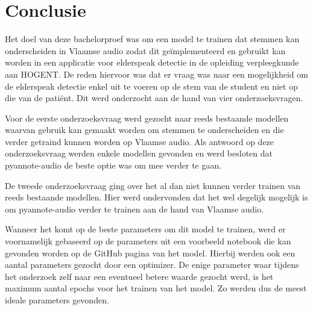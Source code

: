 
\chapter{Conclusie}%
\label{ch:conclusie}


Het doel van deze bachelorproef was om een model te trainen dat stemmen kan onderscheiden in Vlaamse audio zodat dit geïmplementeerd en gebruikt kan worden in een applicatie voor elderspeak detectie in de opleiding verpleegkunde aan HOGENT. De reden hiervoor was dat er vraag was naar een mogelijkheid om de elderspeak detectie enkel uit te voeren op de stem van de student en niet op die van de patiënt. Dit werd onderzocht aan de hand van vier onderzoeksvragen.

Voor de eerste onderzoeksvraag werd gezocht naar reeds bestaande modellen waarvan gebruik kan gemaakt worden om stemmen te onderscheiden en die verder getraind kunnen worden op Vlaamse audio. Als antwoord op deze onderzoeksvraag werden enkele modellen gevonden en werd besloten dat pyannote-audio de beste optie was om mee verder te gaan.

De tweede onderzoeksvraag ging over het al dan niet kunnen verder trainen van reeds bestaande modellen. Hier werd ondervonden dat het wel degelijk mogelijk is om pyannote-audio verder te trainen aan de hand van Vlaamse audio.

Wanneer het komt op de beste parameters om dit model te trainen, werd er voornamelijk gebaseerd op de parameters uit een voorbeeld notebook die kan gevonden worden op de GitHub pagina van het model. Hierbij werden ook een aantal parameters gezocht door een optimizer. De enige parameter waar tijdens het onderzoek zelf naar een eventueel betere waarde gezocht werd, is het maximum aantal epochs voor het trainen van het model. Zo werden dus de meest ideale parameters gevonden.

